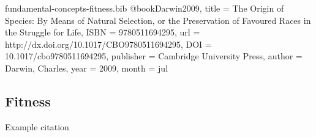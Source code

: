 \begin{bibunit}

\begin{filecontents*}[overwrite]{fundamental-concepts-fitness.bib}
@book{Darwin2009,
  title = {The Origin of Species: By Means of Natural Selection,  or the Preservation of Favoured Races in the Struggle for Life},
  ISBN = {9780511694295},
  url = {http://dx.doi.org/10.1017/CBO9780511694295},
  DOI = {10.1017/cbo9780511694295},
  publisher = {Cambridge University Press},
  author = {Darwin,  Charles},
  year = {2009},
  month = jul 
}
\end{filecontents*} 

\subsection{Fitness}
\label{sec:fitness}

Example citation \citep{Darwin2009}

    
\end{bibunit}
